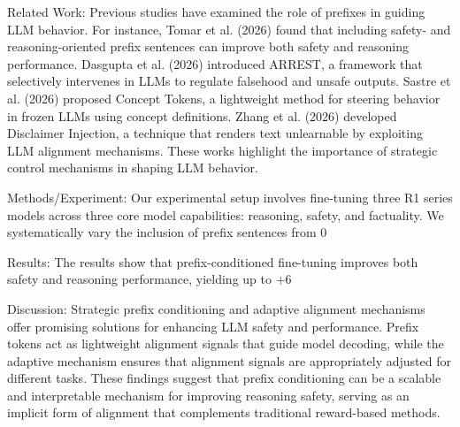 Related Work:
Previous studies have examined the role of prefixes in guiding LLM behavior. For instance, Tomar et al. (2026) found that including safety- and reasoning-oriented prefix sentences can improve both safety and reasoning performance. Dasgupta et al. (2026) introduced ARREST, a framework that selectively intervenes in LLMs to regulate falsehood and unsafe outputs. Sastre et al. (2026) proposed Concept Tokens, a lightweight method for steering behavior in frozen LLMs using concept definitions. Zhang et al. (2026) developed Disclaimer Injection, a technique that renders text unlearnable by exploiting LLM alignment mechanisms. These works highlight the importance of strategic control mechanisms in shaping LLM behavior.

Methods/Experiment:
Our experimental setup involves fine-tuning three R1 series models across three core model capabilities: reasoning, safety, and factuality. We systematically vary the inclusion of prefix sentences from 0%

Results:
The results show that prefix-conditioned fine-tuning improves both safety and reasoning performance, yielding up to +6%

Discussion:
Strategic prefix conditioning and adaptive alignment mechanisms offer promising solutions for enhancing LLM safety and performance. Prefix tokens act as lightweight alignment signals that guide model decoding, while the adaptive mechanism ensures that alignment signals are appropriately adjusted for different tasks. These findings suggest that prefix conditioning can be a scalable and interpretable mechanism for improving reasoning safety, serving as an implicit form of alignment that complements traditional reward-based methods.

